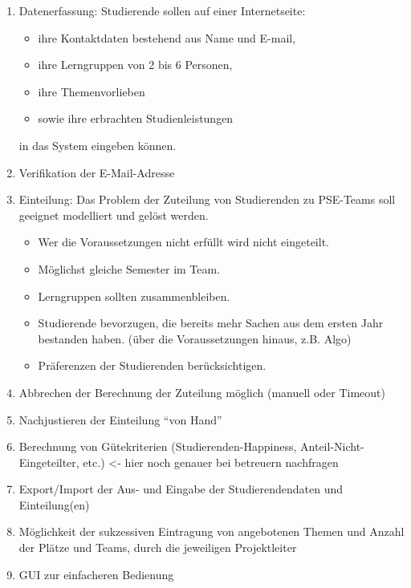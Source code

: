 \documentclass[parskip=full]{scrartcl}
\begin{document}
\begin{enumerate}[{Z}1]
    \item Datenerfassung: Studierende sollen auf einer Internetseite:   
    \begin{itemize}
        \item ihre Kontaktdaten bestehend aus Name und E-mail,
        \item ihre Lerngruppen von 2 bis 6 Personen,
        \item ihre Themenvorlieben 
        \item sowie ihre erbrachten Studienleistungen 
    \end{itemize}
    in das System eingeben können.
    
    \item  Verifikation der E-Mail-Adresse
    

    \item Einteilung: Das Problem der Zuteilung von Studierenden zu PSE-Teams
    soll geeignet modelliert und gelöst werden. 
        \begin{itemize}
        \item Wer die Voraussetzungen nicht erfüllt wird nicht eingeteilt.

        \item Möglichst gleiche Semester im Team.

        \item Lerngruppen sollten zusammenbleiben.

        \item Studierende bevorzugen, die bereits mehr Sachen aus dem ersten Jahr
        bestanden haben. (über die Voraussetzungen hinaus, z.B. Algo)

        \item Präferenzen der Studierenden berücksichtigen.
        \end{itemize}

    \item Abbrechen der Berechnung der Zuteilung möglich (manuell oder Timeout)

    \item Nachjustieren der Einteilung “von Hand”

    \item Berechnung von Gütekriterien (Studierenden-Happiness,
    Anteil-Nicht-Eingeteilter, etc.) <- hier noch genauer bei betreuern
    nachfragen

    

    \item Export/Import der Aus- und Eingabe der Studierendendaten und
    Einteilung(en)

    \item Möglichkeit der sukzessiven Eintragung von angebotenen Themen und
    Anzahl der Plätze und Teams, durch die jeweiligen Projektleiter

    \item GUI zur einfacheren Bedienung

    

    
\end{enumerate}
\end{document}
